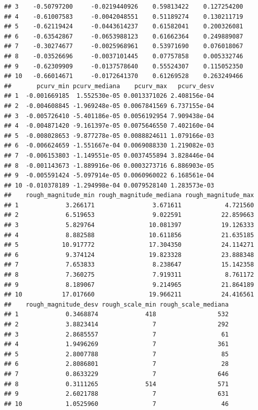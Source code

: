 \documentclass[11pt,]{article}
\begin{document}
\begin{verbatim}
## 3    -0.50797200     -0.0219440926    0.59813422    0.127254200
## 4    -0.61007583     -0.0042048551    0.51189274    0.130211719
## 5    -0.62119424     -0.0443614237    0.61582041    0.200326081
## 6    -0.63542867     -0.0653988123    0.61662364    0.249889087
## 7    -0.30274677     -0.0025968961    0.53971690    0.076018067
## 8    -0.03526696     -0.0037101445    0.07757858    0.005332746
## 9    -0.62309909     -0.0137578640    0.55524307    0.115052350
## 10   -0.66014671     -0.0172641370    0.61269528    0.263249466
##       pcurv_min pcurv_mediana    pcurv_max   pcurv_desv
## 1  -0.001669185  1.552530e-05 0.0013371026 2.408156e-04
## 2  -0.004608845 -1.969248e-05 0.0067841569 6.737155e-04
## 3  -0.005726410 -5.401186e-05 0.0056192954 7.909438e-04
## 4  -0.004871420 -9.161397e-05 0.0075646550 7.402160e-04
## 5  -0.008028653 -9.877278e-05 0.0088824611 1.079166e-03
## 6  -0.006624659 -1.551667e-04 0.0069088330 1.219082e-03
## 7  -0.006153803 -1.149551e-05 0.0037455894 3.828446e-04
## 8  -0.001143673 -1.889916e-06 0.0003273716 6.886903e-05
## 9  -0.005591424 -5.097914e-05 0.0060960022 6.168561e-04
## 10 -0.010378189 -1.294998e-04 0.0079528140 1.283573e-03
##    rough_magnitude_min rough_magnitude_mediana rough_magnitude_max
## 1             3.266171                3.671611            4.721560
## 2             6.519653                9.022591           22.859663
## 3             5.829764               10.081397           19.126333
## 4             8.882588               10.611856           21.635185
## 5            10.917772               17.304350           24.114271
## 6             9.374124               19.823328           23.888348
## 7             7.653833                8.238647           15.142358
## 8             7.360275                7.919311            8.761172
## 9             8.189067                9.214965           21.864189
## 10           17.017660               19.966211           24.416561
##    rough_magnitude_desv rough_scale_min rough_scale_mediana
## 1             0.3468874             418                 532
## 2             3.8823414               7                 292
## 3             2.8685557               7                  61
## 4             1.9496269               7                 361
## 5             2.8007788               7                  85
## 6             2.8086801               7                  28
## 7             0.8633229               7                 646
## 8             0.3111265             514                 571
## 9             2.6021788               7                 631
## 10            1.0525960               7                  46

\end{verbatim}
\end{document}
